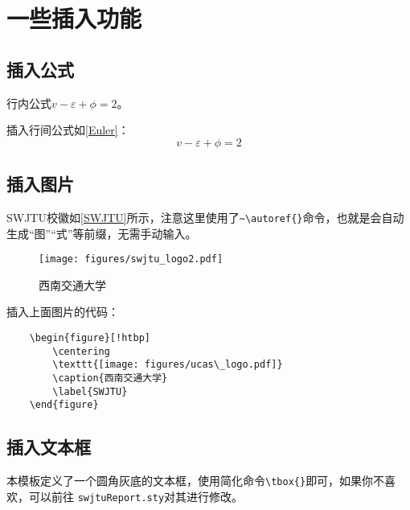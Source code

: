 \section{一些插入功能}
\subsection{插入公式}
行内公式$v-\varepsilon+\phi=2$。

插入行间公式如\autoref{Euler}：
\begin{equation}
    v-\varepsilon+\phi=2
    \label{Euler}
\end{equation}

\subsection{插入图片}
SWJTU校徽如\autoref{SWJTU}所示，注意这里使用了\verb|~\autoref{}|命令，也就是会自动生成“图”“式”等前缀，无需手动输入。

\begin{figure}[!htbp]
    \centering
    \texttt{[image: figures/swjtu\_logo2.pdf]}
    \caption{西南交通大学}
    \label{SWJTU}
\end{figure}

插入上面图片的代码：

\begin{verbatim}
    \begin{figure}[!htbp]
        \centering
        \texttt{[image: figures/ucas\_logo.pdf]}
        \caption{西南交通大学}
        \label{SWJTU}
    \end{figure}
\end{verbatim}

\subsection{插入文本框}
本模板定义了一个圆角灰底的文本框，使用简化命令\verb|\tbox{}|即可，如果你不喜欢，可以前往 \texttt{swjtuReport.sty}对其进行修改。


